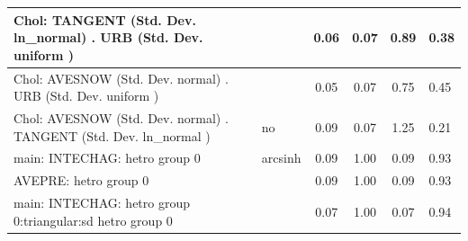 \begin{table}
\begin{center}
\begin{tabular}{|l|l|c|c|c|l|}
			\hline
			 Chol: TANGENT (Std. Dev. ln_normal) . URB (Std. Dev.   uniform ) &  & 0.06 & 0.07 & 0.89 & 0.38 \\
			\hline
			 Chol: AVESNOW (Std. Dev. normal) . URB (Std. Dev.   uniform ) &  & 0.05 & 0.07 & 0.75 & 0.45 \\
			\hline
			 Chol: AVESNOW (Std. Dev. normal) . TANGENT (Std. Dev.   ln_normal ) & no & 0.09 & 0.07 & 1.25 & 0.21 \\
			\hline
			main: INTECHAG: hetro group 0 & arcsinh & 0.09 & 1.00 & 0.09 & 0.93 \\
			\hline
			AVEPRE: hetro group 0 &  & 0.09 & 1.00 & 0.09 & 0.93 \\
			\hline
			main: INTECHAG: hetro group 0:triangular:sd  hetro group 0 &  & 0.07 & 1.00 & 0.07 & 0.94 \\
			\hline
		\end{tabular}
	\end{center}
\end{table}